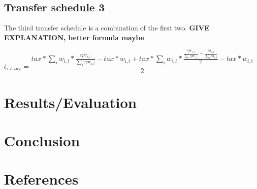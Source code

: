 \documentclass[10pt,a4]{article}
\begin{document}
\subsection{Transfer schedule 3}
The third transfer schedule is a combination of the first two. \textbf{GIVE EXPLANATION, better formula maybe}

\begin{equation}
    t_{i,t,tax} = \frac{tax * \sum_i w_{i,t} * \frac{rpc_{i,t}}{\sum_i rpc_{i,t}} - tax * w_{i,t} + tax * \sum_i w_{i,t} * \frac{\frac{rpc_{i,t}}{\sum_i rpc_{i,t}} + \frac{pd_{i,t}}{\sum_i pd_{i,t}}}{2} - tax * w_{i,t}}{2} 
    \label{transfer schedule 3}
\end{equation}


\section{Results/Evaluation}

\section{Conclusion}

\section{References}
\end{document}
